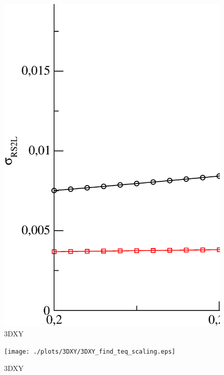 \begin{figure}[!htpb]
  \centering
  \includegraphics[width=15cm]{./plots/3DXY/std_intersect_RS_vs_omega.eps}
  \caption{3DXY}
\end{figure}

\begin{figure}[!htpb]
  \centering
  \texttt{[image: ./plots/3DXY/3DXY\_find\_teq\_scaling.eps]}
  \caption{3DXY}
\end{figure}

